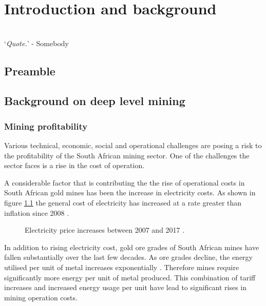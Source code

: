 \chapter{Introduction and background}  %
\vspace{38em}
\hrulefill
\\
\enquote*{\textit{Quote.}} - Somebody\\
\newpage
\setcounter{page}{2}
\section{Preamble}
\section{Background on deep level mining}
\subsection{Mining profitability}
 Various technical, economic, social and operational challenges are posing a risk to the profitability of the South African mining sector. One of the challenges the sector faces  is a rise in the cost of operation\cite{neingo2016trends}.\par
A considerable factor that is contributing the the rise of operational costs in South African gold mines has been the increase in electricity costs. As shown in figure \ref{fig: Eskom tariffs} the general cost of electricity has increased at a rate greater than inflation since 2008 \cite{Eskom2013Tariffs}.
\begin{figure}[h]
	\centering
	\fbox{}
	\caption[Electricity price increases between 2007 and 2017.]{Electricity price increases between 2007 and 2017 \cite{Eskom2013Tariffs,Inflation2013}.}
	\label{fig: Eskom tariffs}
\end{figure}
\par
In addition to rising electricity cost, gold ore grades of South African mines have fallen substantially over the last few decades\cite{mudd2007global}. As ore grades decline, the energy utilised per unit of metal increases exponentially \cite{muller2010numerical}. Therefore mines require significantly more energy per unit of metal produced. This combination of tariff increases and increased energy usage per unit  have lead to significant rises in mining operation costs.
